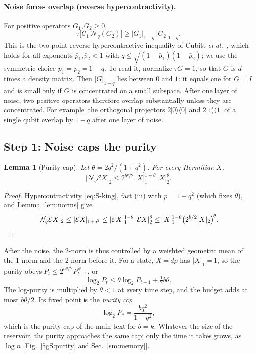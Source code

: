 \documentclass[aps,prl,twocolumn,superscriptaddress,floatfix]{revtex4-2}
\theoremstyle{plain}
\newtheorem{lemma}{Lemma}
\newcommand{\ketbra}[2]{|#1\rangle\!\langle #2|}
\newcommand{\nrm}[2]{\lvert #1\rvert_{#2}}
\newcommand{\cE}{\mathcal E}
\newcommand{\Nq}{\mathcal N_q}
\begin{document}
\paragraph*{Noise forces overlap (reverse hypercontractivity).} For positive operators $G_1,G_2\ge0$,
\begin{equation}
\tau\bigl[G_1\,\Nq(G_2)\bigr]\ge\nrm{G_1}{1-q}\,\nrm{G_2}{1-q} .
\label{eq:S-cubitt}
\end{equation}
This is the two-point reverse hypercontractive inequality of Cubitt \emph{et al.}~\cite[Corollary~14]{Cubitt2015}, which holds for all exponents $\bar p_1,\bar p_2<1$ with $q\le\sqrt{(1-\bar p_1)(1-\bar p_2)}$; we use the symmetric choice $\bar p_1=\bar p_2=1-q$. To read it, normalize $\tau G=1$, so that $G$ is $d$ times a density matrix. Then $\nrm G{1-q}$ lies between $0$ and $1$: it equals one for $G=I$ and is small only if $G$ is concentrated on a small subspace. After one layer of noise, two positive operators therefore overlap substantially unless they are concentrated. For example, the orthogonal projectors $2\ketbra00$ and $2\ketbra11$ of a single qubit overlap by $1-q$ after one layer of noise.

\subsection{Step 1: Noise caps the purity}
\label{sm:cap}

\begin{lemma}[Purity cap]\label{lem:cap}
Let $\theta=2q^2/(1+q^2)$. For every Hermitian $X$,
\begin{equation}
\nrm{\Nq\cE X}2\le2^{b\theta/2}\,\nrm X1^{1-\theta}\,\nrm X2^{\theta}.
\label{eq:S-cap}
\end{equation}
\end{lemma}

\begin{proof}
Hypercontractivity~\eqref{eq:S-king}, fact (iii) with $p=1+q^2$ (which fixes $\theta$), and Lemma~\ref{lem:norms} give
\[
\nrm{\Nq\cE X}2\le\nrm{\cE X}{1+q^2}\le\nrm{\cE X}1^{1-\theta}\,\nrm{\cE X}2^{\theta}\le\nrm X1^{1-\theta}\bigl(2^{b/2}\nrm X2\bigr)^{\theta}. \qedhere
\]
\end{proof}

After the noise, the 2-norm is thus controlled by a weighted geometric mean of the 1-norm and the 2-norm before it. For a state, $X=d\rho$ has $\nrm X1=1$, so the purity obeys $P_t\le2^{b\theta/2}P_{t-1}^{\,\theta}$, or
\begin{equation}
\log_2P_t\le\theta\log_2P_{t-1}+\tfrac12b\theta .
\label{eq:S-purityrec}
\end{equation}
The log-purity is multiplied by $\theta<1$ at every time step, and the budget adds at most $b\theta/2$. Its fixed point is the \emph{purity cap}
\begin{equation}
\log_2P_*=\frac{bq^2}{1-q^2},
\label{eq:S-Pstar}
\end{equation}
which is the purity cap of the main text for $b=k$. Whatever the size of the reservoir, the purity approaches the same cap; only the time it takes grows, as $\log n$ [Fig.~\ref{figS:purity} and Sec.~\ref{sm:memory}].
\end{document}
